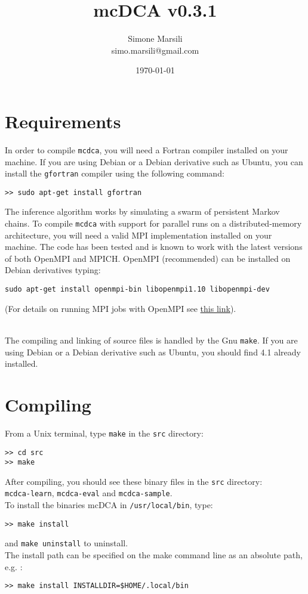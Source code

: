 \documentclass[a4paper,onecolumn]{article}
\title{mcDCA v0.3.1}
\author{
        Simone Marsili \\
        simo.marsili@gmail.com
}
\date{\today}
\begin{document}
\maketitle

\section{Requirements}
\label{sec:requirements}

In order to compile \verb|mcdca|, you will need a Fortran compiler installed on your machine.   
If you are using Debian or a Debian derivative such as Ubuntu, you can install the \verb|gfortran| compiler using the following command:
\begin{verbatim}
>> sudo apt-get install gfortran
\end{verbatim}

The inference algorithm works by simulating a swarm of persistent Markov chains. 
To compile \verb|mcdca| with support for parallel runs on a distributed-memory architecture,
you will need a valid MPI implementation installed on your machine. 
The code has been tested and is known to work with the latest versions of both OpenMPI and MPICH.   
OpenMPI (recommended) can be installed on Debian derivatives typing:
\begin{verbatim}
sudo apt-get install openmpi-bin libopenmpi1.10 libopenmpi-dev
\end{verbatim}
(For details on running MPI jobs with OpenMPI see \href{https://www.open-mpi.org/faq/?category=running}{this link}).
\\\

The compiling and linking of source files is handled by the Gnu \verb|make|. 
If you are using Debian or a Debian derivative such as Ubuntu, you should find 4.1 already installed.

\section{Compiling}
\label{sec:compiling}
From a Unix terminal, type \verb|make| in the \verb|src| directory:
\begin{verbatim}
>> cd src
>> make
\end{verbatim}
After compiling, you should see these binary files in the \verb|src| directory:\\
\verb|mcdca-learn|, \verb|mcdca-eval| and \verb|mcdca-sample|. \\
To install the binaries mcDCA in \verb|/usr/local/bin|, type:
\begin{verbatim}
>> make install
\end{verbatim}
and \verb|make uninstall| to uninstall.\\
The install path can be specified on the make command line as an absolute path,
e.g. :
\begin{verbatim}
>> make install INSTALLDIR=$HOME/.local/bin
\end{verbatim}
\end{document}
